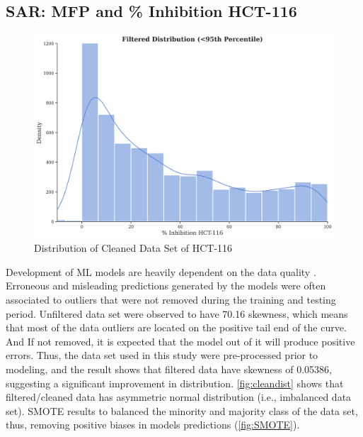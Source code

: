 \subsection*{SAR: MFP and \% Inhibition HCT-116}
\begin{figure}[htbp] %
	\centering
	\hspace{-1cm}
	\includegraphics[scale=0.5]{cleandatadist.png}%
	\caption{Distribution of Cleaned Data Set of HCT-116}
	\label{fig:cleandist} %
\end{figure}

Development of ML models are heavily dependent on the data quality \cite{zhou2024dataquality}. Erroneous and misleading predictions generated by the models were often associated to outliers that were not removed during the training and testing period. Unfiltered data set were observed to have 70.16 skewness, which means that most of the data outliers are located on the positive tail end of the curve. And If not removed, it is expected that the model out of it will produce positive errors. Thus, the data set used in this study were pre-processed prior to modeling, and the result shows that filtered data have skewness of 0.05386, suggesting a significant improvement in distribution. \autoref{fig:cleandist} shows that filtered/cleaned data has asymmetric normal distribution (i.e., imbalanced data set). SMOTE results to balanced the minority and majority class of the data set, thus, removing positive biases in models predictions (\autoref{fig:SMOTE}).

